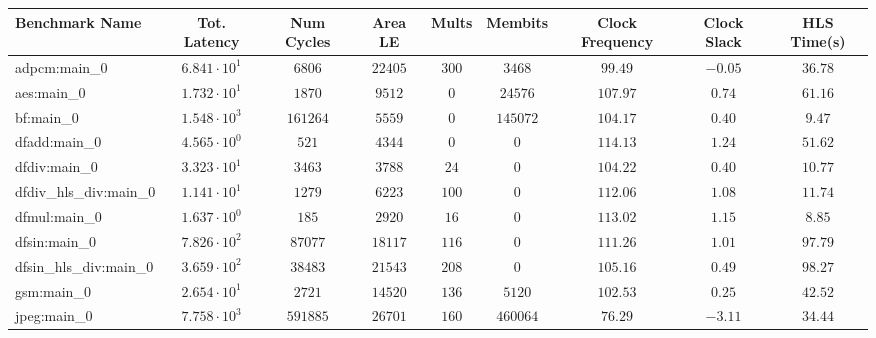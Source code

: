 \begin{tabular}{|l|c|c|c|c|c|c|c|c|}
\hline
Benchmark Name          & Tot. Latency           & Num Cycles  & Area LE    & Mults    & Membits    & Clock Frequency & Clock Slack & HLS Time(s) \\
\hline
adpcm:main\_0           & $ 6.841 \cdot 10^{1} $ & $ 6806    $ & $ 22405  $ & $ 300  $ & $ 3468   $ & $ 99.49       $ & $ -0.05   $ & $ 36.78   $ \\
aes:main\_0             & $ 1.732 \cdot 10^{1} $ & $ 1870    $ & $ 9512   $ & $ 0    $ & $ 24576  $ & $ 107.97      $ & $ 0.74    $ & $ 61.16   $ \\
bf:main\_0              & $ 1.548 \cdot 10^{3} $ & $ 161264  $ & $ 5559   $ & $ 0    $ & $ 145072 $ & $ 104.17      $ & $ 0.40    $ & $ 9.47    $ \\
dfadd:main\_0           & $ 4.565 \cdot 10^{0} $ & $ 521     $ & $ 4344   $ & $ 0    $ & $ 0      $ & $ 114.13      $ & $ 1.24    $ & $ 51.62   $ \\
dfdiv:main\_0           & $ 3.323 \cdot 10^{1} $ & $ 3463    $ & $ 3788   $ & $ 24   $ & $ 0      $ & $ 104.22      $ & $ 0.40    $ & $ 10.77   $ \\
dfdiv\_hls\_div:main\_0 & $ 1.141 \cdot 10^{1} $ & $ 1279    $ & $ 6223   $ & $ 100  $ & $ 0      $ & $ 112.06      $ & $ 1.08    $ & $ 11.74   $ \\
dfmul:main\_0           & $ 1.637 \cdot 10^{0} $ & $ 185     $ & $ 2920   $ & $ 16   $ & $ 0      $ & $ 113.02      $ & $ 1.15    $ & $ 8.85    $ \\
dfsin:main\_0           & $ 7.826 \cdot 10^{2} $ & $ 87077   $ & $ 18117  $ & $ 116  $ & $ 0      $ & $ 111.26      $ & $ 1.01    $ & $ 97.79   $ \\
dfsin\_hls\_div:main\_0 & $ 3.659 \cdot 10^{2} $ & $ 38483   $ & $ 21543  $ & $ 208  $ & $ 0      $ & $ 105.16      $ & $ 0.49    $ & $ 98.27   $ \\
gsm:main\_0             & $ 2.654 \cdot 10^{1} $ & $ 2721    $ & $ 14520  $ & $ 136  $ & $ 5120   $ & $ 102.53      $ & $ 0.25    $ & $ 42.52   $ \\
jpeg:main\_0            & $ 7.758 \cdot 10^{3} $ & $ 591885  $ & $ 26701  $ & $ 160  $ & $ 460064 $ & $ 76.29       $ & $ -3.11   $ & $ 34.44   $ \\

\end{tabular}
